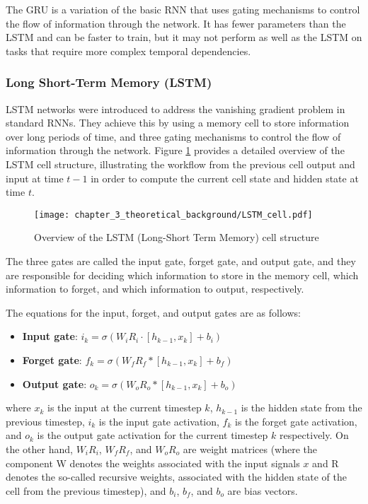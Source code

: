 The \ac{GRU} is a variation of the basic \ac{RNN} that uses gating mechanisms to control the flow of information through the network. It has fewer parameters than the \ac{LSTM} and can be faster to train, but it may not perform as well as the \ac{LSTM} on tasks that require more complex temporal dependencies.

\subsubsection{Long Short-Term Memory (LSTM)}
\label{subsubsec:3_LSTMs}

\ac{LSTM} networks were introduced to address the vanishing gradient problem in standard \acp{RNN}. They achieve this by using a memory cell to store information over long periods of time, and three gating mechanisms to control the flow of information through the network. Figure \ref{fig:chapter_3_theoretical_background/LSTM} provides a detailed overview of the \ac{LSTM} cell structure, illustrating the workflow from the previous cell output and input at time $t-1$ in order to compute the current cell state and hidden state at time $t$.

\begin{figure}[h]
	\centering
	\texttt{[image: chapter\_3\_theoretical\_background/LSTM\_cell.pdf]}
	\caption{Overview of the LSTM (Long-Short Term Memory) cell structure}
	\label{fig:chapter_3_theoretical_background/LSTM}
\end{figure}

The three gates are called the input gate, forget gate, and output gate, and they are responsible for deciding which information to store in the memory cell, which information to forget, and which information to output, respectively.

The equations for the input, forget, and output gates are as follows:

\begin{itemize}
	\item \textbf{Input gate}: $i_k = \sigma(W_i R_i \cdot [h_{k-1}, x_k] + b_i)$
	\item \textbf{Forget gate}: $f_k = \sigma(W_f R_f * [h_{k-1}, x_k] + b_f)$
	\item \textbf{Output gate}: $o_k = \sigma(W_o R_o * [h_{k-1}, x_k] + b_o)$
\end{itemize}

where $x_k$ is the input at the current timestep $k$, $h_{k-1}$ is the hidden state from the previous timestep, $i_k$ is the input gate activation, $f_k$ is the forget gate activation, and $o_k$ is the output gate activation for the current timestep $k$ respectively. On the other hand, $W_i R_i$, $W_f R_f$, and $W_o R_o$ are weight matrices (where the component W denotes the weights associated with the input signals $x$ and R denotes the so-called recursive weights, associated with the hidden state of the cell from the previous timestep), and $b_i$, $b_f$, and $b_o$ are bias vectors.

